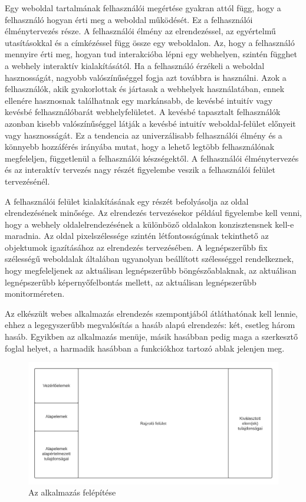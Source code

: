 

Egy weboldal tartalmának felhasználói megértése gyakran attól függ, hogy a felhasználó hogyan érti meg a weboldal működését. Ez a felhasználói élménytervezés része. A felhasználói élmény az elrendezéssel, az egyértelmű utasításokkal és a címkézéssel függ össze egy weboldalon. Az, hogy a felhasználó mennyire érti meg, hogyan tud interakcióba lépni egy webhelyen, szintén függhet a webhely interaktív kialakításától. Ha a felhasználó érzékeli a weboldal hasznosságát, nagyobb valószínűséggel fogja azt továbbra is használni. Azok a felhasználók, akik gyakorlottak és jártasak a webhelyek használatában, ennek ellenére hasznosnak találhatnak egy markánsabb, de kevésbé intuitív vagy kevésbé felhasználóbarát webhelyfelületet. A kevésbé tapasztalt felhasználók azonban kisebb valószínűséggel látják a kevésbé intuitív weboldal-felület előnyeit vagy hasznosságát. Ez a tendencia az univerzálisabb felhasználói élmény és a könnyebb hozzáférés irányába mutat, hogy a lehető legtöbb felhasználónak megfeleljen, függetlenül a felhasználói készségektől. A felhasználói élménytervezés és az interaktív tervezés nagy részét figyelembe veszik a felhasználói felület tervezésénél.


A felhasználói felület kialakításának egy részét befolyásolja az oldal elrendezésének minősége. Az elrendezés tervezésekor például figyelembe kell venni, hogy a webhely oldalelrendezésének a különböző oldalakon konzisztensnek kell-e maradnia. Az oldal pixelszélessége szintén létfontosságúnak tekinthető az objektumok igazításához az elrendezés tervezésében. A legnépszerűbb fix szélességű weboldalak általában ugyanolyan beállított szélességgel rendelkeznek, hogy megfeleljenek az aktuálisan legnépszerűbb böngészőablaknak, az aktuálisan legnépszerűbb képernyőfelbontás mellett, az aktuálisan legnépszerűbb monitorméreten.

Az elkészült webes alkalmazás elrendezés szempontjából átláthatónak kell lennie, ehhez a legegyszerűbb megvalósítás a hasáb alapú elrendezés: két, esetleg három hasáb. Egyikben az alkalmazás menüje, másik hasábban pedig maga a szerkesztő foglal helyet, a harmadik hasábban a funkciókhoz tartozó ablak jelenjen meg. 

\begin{figure}[!h]
	\label{fig:block}
	\includegraphics[width=\textwidth]{images/block.png}
	\caption{Az alkalmazás felépítése}
\end{figure}

